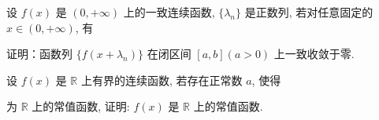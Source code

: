 \par{}
设 $f(x)$ 是 $(0, +\infty)$ 上的一致连续函数, $\{\lambda_n\}$ 是正数列, 若对任意固定的 $x \in (0, +\infty)$, 有\par
\nopagebreak[4]
证明：函数列 $\{f(x + \lambda_n)\}$ 在闭区间 $[a,b](a > 0)$ 上一致收敛于零.\par
\par{}
设 $f(x)$ 是 $\mathbb{R}$ 上有界的连续函数, 若存在正常数 $a$, 使得\par
\nopagebreak[4]
为 $\mathbb{R}$ 上的常值函数, 证明: $f(x)$ 是 $\mathbb{R}$ 上的常值函数.\par
